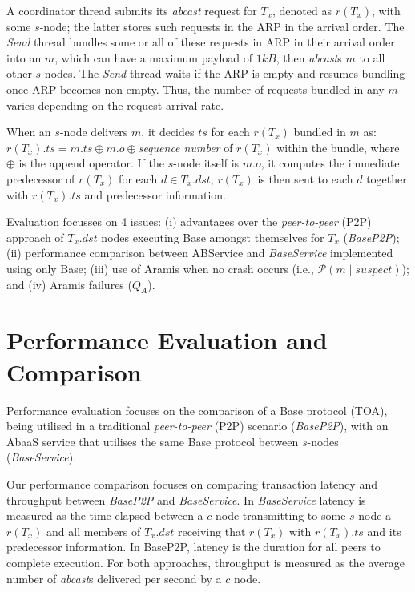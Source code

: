 A coordinator thread submits its \emph{abcast} request for $T_x$, denoted as $r(T_x)$, with some $s$-node; the latter stores such requests in the ARP in the arrival order. The \emph{Send} thread bundles some or all of these requests in ARP in their arrival order into an $m$, which can have a maximum payload of $1kB$, then \emph{abcast}s $m$ to all other $s$-nodes.  The \emph{Send} thread waits if the ARP is empty and resumes bundling once ARP becomes non-empty. Thus, the number of requests bundled in any $m$ varies depending on the request arrival rate. 

When an $s$-node delivers $m$, it decides $ts$ for each $r(T_x)$ bundled in $m$ as: $r(T_x).ts= m.ts\oplus m.o \oplus$\emph{sequence number} of $r(T_x)$ within the bundle, where $\oplus$ is the append operator. If the $s$-node itself is $m.o$, it computes the immediate predecessor of $r(T_x)$ for each $d \in T_x.dst$; $r(T_x)$ is then sent to each $d$ together with $r(T_x).ts$ and predecessor information.

Evaluation focusses on 4 issues: (i) advantages over the
\emph{peer-to-peer} (P2P) approach of $T_x.dst$ nodes executing Base
amongst themselves for $T_x$ (\emph{BaseP2P});
(ii) performance comparison between ABService and \emph{BaseService}
implemented using only Base; (iii) use of Aramis when no crash
occurs (i.e., $\mathcal{P}(m \mid suspect)$); and (iv) Aramis
failures ($Q_A$).

\section{Performance Evaluation and Comparison}\label{sec:abaas_results}
Performance evaluation focuses on the comparison of a \textsf{Base} protocol (TOA), being utilised in a traditional \emph{peer-to-peer} (P2P) scenario (\emph{BaseP2P}), with an \textsf{AbaaS} service that utilises the same \textsf{Base} protocol between $s$-nodes (\emph{BaseService}).

Our performance comparison focuses on comparing transaction latency and throughput between \emph{BaseP2P} and \emph{BaseService}.  In \emph{BaseService} latency is measured as the time elapsed between a $c$ node transmitting to some $s$-node a $r(T_x)$  and all members of $T_x.dst$ receiving that $r(T_x)$ with $r(T_x).ts$ and its predecessor information. In BaseP2P, latency is the duration for all peers to complete execution. For both approaches, throughput is measured as the average number of \emph{abcast}s delivered per second by a $c$ node.

